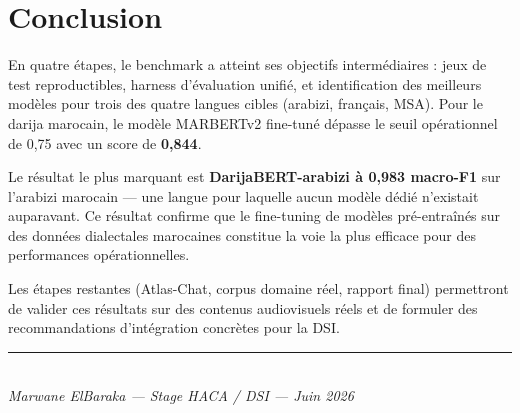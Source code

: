 \documentclass[12pt, a4paper]{article}
\begin{document}
\section{Conclusion}

En quatre étapes, le benchmark a atteint ses objectifs intermédiaires :
jeux de test reproductibles, harness d'évaluation unifié, et identification
des meilleurs modèles pour trois des quatre langues cibles (arabizi, français,
MSA). Pour le darija marocain, le modèle MARBERTv2 fine-tuné dépasse le seuil
opérationnel de 0{,}75 avec un score de \textbf{0{,}844}.

Le résultat le plus marquant est \textbf{DarijaBERT-arabizi à 0{,}983 macro-F1}
sur l'arabizi marocain — une langue pour laquelle aucun modèle dédié
n'existait auparavant. Ce résultat confirme que le fine-tuning de modèles
pré-entraînés sur des données dialectales marocaines constitue la voie
la plus efficace pour des performances opérationnelles.

Les étapes restantes (Atlas-Chat, corpus domaine réel, rapport final)
permettront de valider ces résultats sur des contenus audiovisuels réels
et de formuler des recommandations d'intégration concrètes pour la DSI.

\vspace{1cm}
\begin{center}
\rule{0.4\linewidth}{0.5pt}\\[4pt]
\textit{Marwane ElBaraka — Stage HACA / DSI — Juin 2026}
\end{center}
\end{document}
